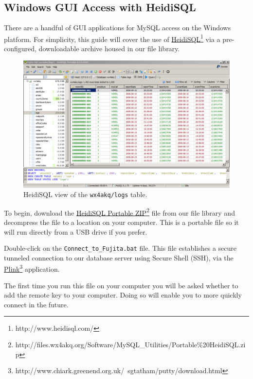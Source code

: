\documentclass[pdflatex,letterpaper,twoside,12pt]{book}
\begin{document}
\subsection{Windows GUI Access with HeidiSQL}

There are a handful of GUI applications for MySQL access on the Windows platform.  For simplicity, this guide will cover the use of \href{http://www.heidisql.com/}{HeidiSQL}\footnote{http://www.heidisql.com/} via a pre-configured, downloadable archive housed in our file library.

\begin{figure}[t]
  \centering
  \includegraphics[width=\textwidth,keepaspectratio=true]{img/heidisql}
  \caption{HeidiSQL view of the \texttt{wx4akq/logs} table.\label{fig:heidisql}}
\end{figure}


To begin, download the \href{http://files.wx4akq.org/Software/MySQL\_Utilities/Portable\%20HeidiSQL.zip}{HeidiSQL Portable ZIP}\footnote{http://files.wx4akq.org/Software/MySQL\_Utilities/Portable\%20HeidiSQL.zip} file from our file library and decompress the file to a location on your computer.  This is a portable file so it will run directly from a USB drive if you prefer.

Double-click on the \texttt{Connect\_to\_Fujita.bat} file.  This file establishes a secure tunneled connection to our database server using Secure Shell (SSH), via the \href{http://www.chiark.greenend.org.uk/~sgtatham/putty/download.html}{Plink}\footnote{http://www.chiark.greenend.org.uk/~sgtatham/putty/download.html} application.

The first time you run this file on your computer you will be asked whether to add the remote key to your computer.  Doing so will enable you to more quickly connect in the future.
\end{document}
